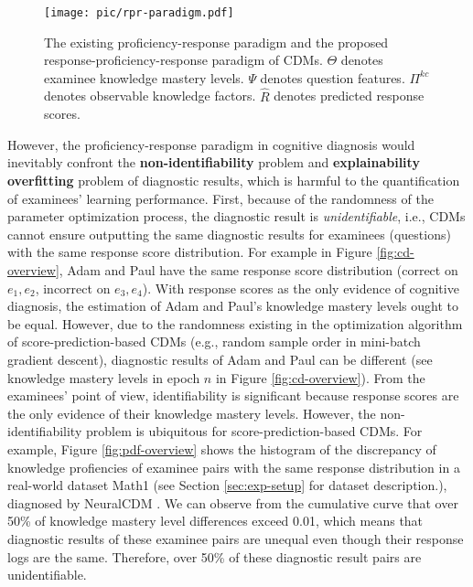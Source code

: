\documentclass[sigconf]{acmart}
\begin{document}
\begin{figure}[t]
  \centering 
  \texttt{[image: pic/rpr-paradigm.pdf]}
  \vspace{-20pt}
  \caption{The existing proficiency-response paradigm and the proposed response-proficiency-response paradigm of CDMs. $\Theta$ denotes examinee knowledge mastery levels. $\Psi$ denotes question features. $\Pi^{kc}$ denotes observable knowledge factors. $\hat{R}$ denotes predicted response scores.}\label{fig:sr-para}
  \vspace{-15pt}
\end{figure}
 
\par However, the proficiency-response paradigm in cognitive diagnosis would inevitably confront the \textbf{non-identifiability}  \cite{Xu2018, Xu2019identifiability} problem and \textbf{explainability overfitting} problem of diagnostic results, which is harmful to the quantification of examinees' learning performance. First, because of the randomness of the parameter optimization process, the diagnostic result is \textit{unidentifiable}, i.e., CDMs cannot ensure outputting the same diagnostic results for examinees (questions) with the same response score distribution. For example in Figure \ref{fig:cd-overview}, Adam and Paul have the same response score distribution (correct on $e_1, e_2$, incorrect on $e_3, e_4$). With response scores as the only evidence of cognitive diagnosis, the estimation of Adam and Paul's knowledge mastery levels ought to be equal. However, due to the randomness existing in the optimization algorithm of score-prediction-based CDMs (e.g., random sample order in mini-batch gradient descent), diagnostic results of Adam and Paul can be different (see knowledge mastery levels in epoch $n$ in Figure \ref{fig:cd-overview}). From the examinees' point of view, identifiability is significant because response scores are the only evidence of their knowledge mastery levels. However, the non-identifiability problem is ubiquitous for score-prediction-based CDMs. For example, Figure \ref{fig:pdf-overview} shows the histogram of the discrepancy of knowledge profiencies of examinee pairs with the same response distribution in a real-world dataset Math1 (see Section \ref{sec:exp-setup} for dataset description.), diagnosed by NeuralCDM \cite{WangF2022}. We can observe from the cumulative curve that over 50\% of knowledge mastery level differences exceed 0.01, which means that diagnostic results of these examinee pairs are unequal even though their response logs are the same. Therefore, over 50\% of these diagnostic result pairs are unidentifiable. 
\end{document}
